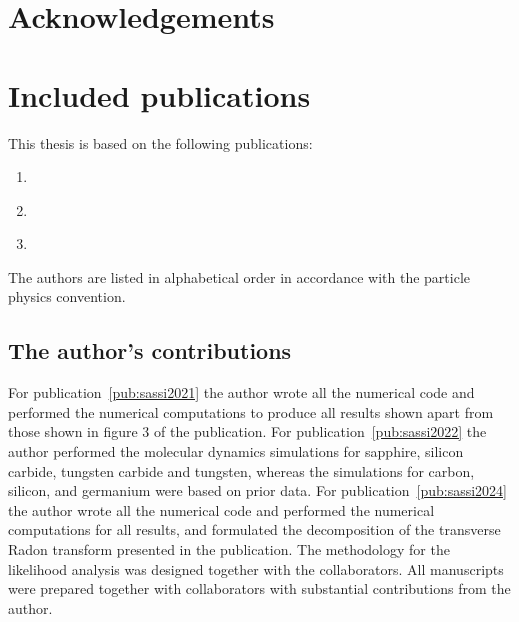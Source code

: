 \documentclass[b5paper, 10pt, twoside]{book}
\begin{document}
\chapter{Acknowledgements}





\chapter{Included publications}

This thesis is based on the following publications:
\begin{enumerate}[label = \Roman*, ref = \Roman*]
    \item\label{pub:sassi2021} 
    \item\label{pub:sassi2022} 
    \item\label{pub:sassi2024} 
\end{enumerate}
The authors are listed in alphabetical order in accordance with the particle physics convention.

\section*{The author's contributions}

For publication~\ref{pub:sassi2021} the author wrote all the numerical code and performed the numerical computations to produce all results shown apart from those shown in figure 3 of the publication. For publication~\ref{pub:sassi2022} the author performed the molecular dynamics simulations for sapphire, silicon carbide, tungsten carbide and tungsten, whereas the simulations for carbon, silicon, and germanium were based on prior data. For publication~\ref{pub:sassi2024} the author wrote all the numerical code and performed the numerical computations for all results, and formulated the decomposition of the transverse Radon transform presented in the publication. The methodology for the likelihood analysis was designed together with the collaborators. All manuscripts were prepared together with collaborators with substantial contributions from the author.
\end{document}
